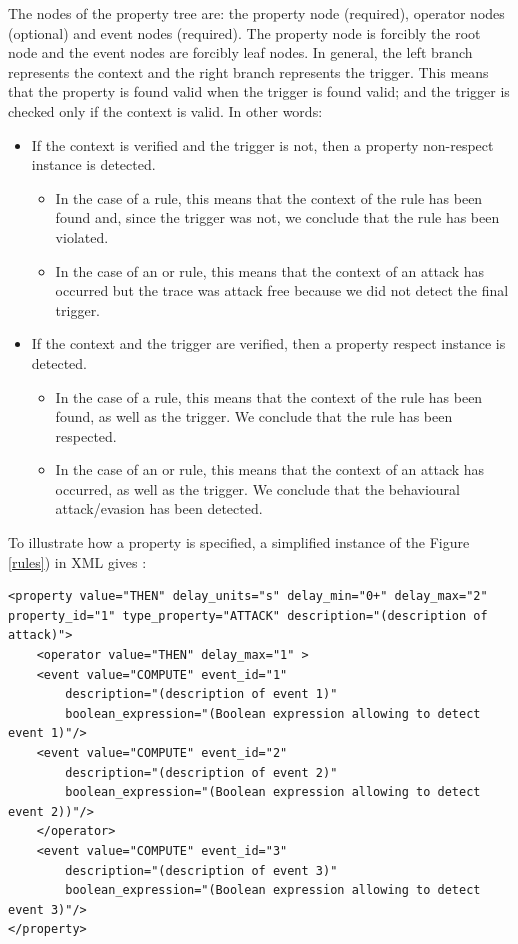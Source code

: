  The nodes of the property tree are: the property node (required),
operator nodes (optional) and event nodes (required). The property node
is forcibly the root node and the event nodes are forcibly leaf nodes.
In general, the left branch represents the context and the right branch represents
the trigger. This means that the property is found valid when the
trigger is found valid; and the trigger is checked only if the context
is valid. In other words:

\begin{itemize}
\item If the context is verified and the trigger is not, then a property
non-respect instance is detected.

\begin{itemize}
\item In the case of a  rule, this means that the context of the rule has
been found and, since the trigger was not, we conclude that the
 rule has been violated.
\item In the case of an  or  rule,
this means that the context of an attack has occurred but the trace was
attack free because we did not detect the final trigger.
\end{itemize}
\item If the context and the trigger are verified, then a property
respect instance is detected.

\begin{itemize}
\item In the case of a  rule, this means that the context of the rule has
been found, as well as the trigger. We conclude that the
 rule has been respected.
\item In the case of an  or  rule,
this means that the context of an attack has occurred, as well as the
trigger. We conclude that the behavioural attack/evasion has been detected.
\end{itemize}
\end{itemize}

To illustrate how a property is specified, a simplified instance of the Figure \ref{rules}) in XML gives :

\begin{lstlisting}[style = XML, title = General format of a property]
<property value="THEN" delay_units="s" delay_min="0+" delay_max="2" property_id="1" type_property="ATTACK" description="(description of attack)">
    <operator value="THEN" delay_max="1" >
    <event value="COMPUTE" event_id="1"
        description="(description of event 1)"
        boolean_expression="(Boolean expression allowing to detect event 1)"/>
    <event value="COMPUTE" event_id="2"
        description="(description of event 2)"
        boolean_expression="(Boolean expression allowing to detect event 2))"/>
    </operator>
    <event value="COMPUTE" event_id="3"
        description="(description of event 3)"
        boolean_expression="(Boolean expression allowing to detect event 3)"/>
</property>
\end{lstlisting}


